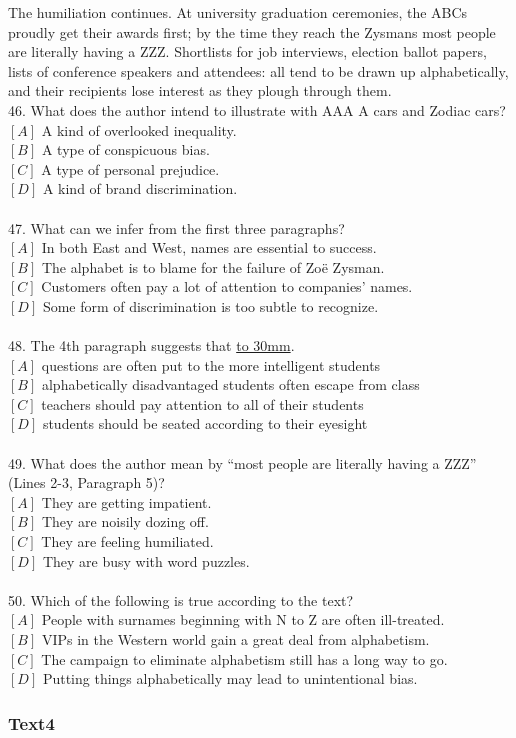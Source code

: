 \documentclass[a4paper]{article}
\begin{document}
\par
The humiliation continues. At university graduation ceremonies, the ABCs proudly get their awards first; by the time they reach the Zysmans most people are literally having a ZZZ. Shortlists for job interviews, election ballot papers, lists of conference speakers and attendees: all tend to be drawn up alphabetically, and their recipients lose interest as they plough through them.
\\46.	What does the author intend to illustrate with AAA A cars and Zodiac cars?\\$[A]$ A kind of overlooked inequality.\\$[B]$ A type of conspicuous bias.\\$[C]$ A type of personal prejudice.\\$[D]$ A kind of brand discrimination.\\\\47.	What can we infer from the first three paragraphs?\\$[A]$ In both East and West, names are essential to success.\\$[B]$ The alphabet is to blame for the failure of Zoë Zysman.\\$[C]$ Customers often pay a lot of attention to companies’ names.\\$[D]$ Some form of discrimination is too subtle to recognize.\\\\48.	The 4th paragraph suggests that \underline{\hbox to 30mm{}}.\\$[A]$ questions are often put to the more intelligent students\\$[B]$ alphabetically disadvantaged students often escape from class\\$[C]$ teachers should pay attention to all of their students\\$[D]$ students should be seated according to their eyesight\\\\49.	What does the author mean by “most people are literally having a ZZZ” (Lines 2-3, Paragraph 5)?\\$[A]$ They are getting impatient.\\$[B]$ They are noisily dozing off.\\$[C]$ They are feeling humiliated.\\$[D]$ They are busy with word puzzles.\\\\50.	Which of the following is true according to the text?\\$[A]$ People with surnames beginning with N to Z are often ill-treated.\\$[B]$ VIPs in the Western world gain a great deal from alphabetism.\\$[C]$ The campaign to eliminate alphabetism still has a long way to go.\\$[D]$ Putting things alphabetically may lead to unintentional bias.\\\subsubsection{Text4}
\end{document}
